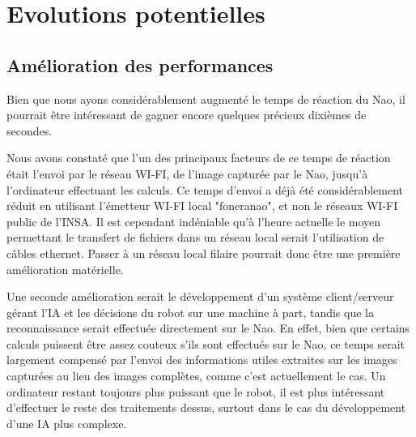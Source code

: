 \section{Evolutions potentielles}
\label{sec:Evolutions potentielles}

  \subsection{Amélioration des performances}
  \label{sub:Améliorations des performances}
    \par Bien que nous ayons considérablement augmenté le temps de réaction du Nao, il pourrait être intéressant de gagner encore quelques précieux dixièmes de secondes.
    \par Nous avons constaté que l'un des principaux facteurs de ce temps de réaction était l'envoi par le réseau WI-FI, de l'image capturée par le Nao, jusqu'à l'ordinateur effectuant les calculs.
    Ce temps d'envoi a déjà été considérablement réduit en utilisant l'émetteur WI-FI local "foneranao", et non le réseaux WI-FI public de l'INSA.
    Il est cependant indéniable qu'à l'heure actuelle le moyen permettant le transfert de fichiers dans un réseau local serait l'utilisation de câbles ethernet.
    Passer à un réseau local filaire pourrait donc être une première amélioration matérielle.
    \par Une seconde amélioration serait le développement d'un système client/serveur gérant l'IA et les décisions du robot sur une machine à part, tandis que la reconnaissance serait effectuée directement sur le Nao.
    En effet, bien que certains calculs puissent être assez couteux s'ils sont effectués sur le Nao,
    ce temps serait largement compensé par l'envoi des informations utiles extraites sur les images capturées au lieu des images complètes, comme c'est actuellement le cas.
    Un ordinateur restant toujours plus puissant que le robot, il est plus intéressant d'effectuer le reste des traitements dessus, surtout dans le cas du développement d'une IA plus complexe.

